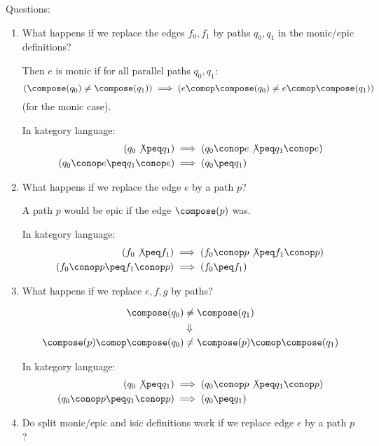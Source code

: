 \documentclass[11pt,openany]{book}
\begin{document}
Questions:
\begin{enumerate}
  \item What happens if we replace the edges $f_0,f_1$
  by paths $q_0,q_1$ in the monic/epic definitions?
  
  Then $e$ is monic if for all parallel paths $q_0,q_1$:
  \[
  \left( \compose(q_0) \neq \compose(q_1) \right) 
  \implies 
  \left( e \comop \compose(q_0) \neq e \comop \compose(q_1) \right)
  \]
  (for the monic case).
  
  In kategory language:
  \begin{align*}
  \left( q_0 \not\peq q_1 \right) 
  & \implies 
  \left( q_0 \conop e \not\peq q_1 \conop e \right)
  \\
  \left( q_0 \conop e \peq q_1 \conop e \right)
  & \implies 
  \left( q_0 \peq q_1 \right) 
  \end{align*}

  \item What happens if we replace the edge $e$ by a path $p$?
  
  A path $p$ would be epic if the edge $\compose(p)$ was.
  
  In kategory language:
  \begin{align*}
  \left( f_0 \not\peq f_1 \right) 
  & \implies 
  \left( f_0 \conop p \not\peq f_1 \conop p \right)
  \\
  \left( f_0 \conop p \peq f_1 \conop p \right)
  & \implies 
  \left( f_0 \peq f_1 \right) 
  \end{align*}
  
  \item What happens if we replace $e,f,g$ by paths?
  
  \begin{align*}
  \compose(q_0) & \neq \compose(q_1) \\
  & \Downarrow \\
  \compose(p) \comop \compose(q_0) 
  & \neq \compose(p) \comop \compose(q_1) 
  \end{align*}
  
  In kategory language:
  \begin{align*}
  \left( q_0 \not\peq q_1 \right) 
  & \implies 
  \left( q_0 \conop p \not\peq q_1 \conop p \right)
  \\
  \left( q_0 \conop p \peq q_1 \conop p \right)
  & \implies 
  \left( q_0 \peq q_1 \right) 
  \end{align*}
  
  \item Do split monic/epic and isic definitions work if we replace
edge $e$ by a path $p$?
\end{enumerate}
\end{document}
